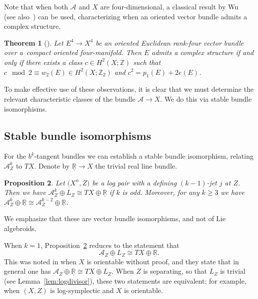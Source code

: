 \documentclass[10pt,a4paper]{amsart}
\numberwithin{equation}{section}
\newtheorem{Theorem}{Theorem}[section]
\newtheorem{Proposition}[Theorem]{Proposition}
 { \theoremstyle{definition}
\newtheorem{Definition}[Theorem]{Definition}
\newtheorem{Example}[Theorem]{Example}
\newtheorem{Remark}[Theorem]{Remark} }
\begin{document}
Note that when both $\mathcal{A}$ and $X$ are four-dimensional, a classical result by Wu~\cite{Wu52} (see also~\cite{HirzebruchHopf58}) can be used, characterizing when an oriented vector bundle admits a complex structure.

\begin{Theorem}[\cite{Wu52}]\label{thm:wuacs} Let $E^4 \to X^4$ be an oriented Euclidean rank-four vector bundle over a~compact oriented four-manifold. Then $E$ admits a complex structure if and only if there exists a class $c \in H^2(X;\mathbb{Z})$ such that $c \!\!\mod 2 \equiv w_2(E) \in H^2(X;\mathbb{Z}_2)$ and $c^2 = p_1(E) + 2 e(E)$.
\end{Theorem}

To make effective use of these observations, it is clear that we must determine the relevant characteristic classes of the bundle $\mathcal{A} \to X$. We do this via stable bundle isomorphisms.

\subsection{Stable bundle isomorphisms}\label{sec:stablebundleiso}

For the $b^k$-tangent bundles we can establish a stable bundle isomorphism, relating $\mathcal{A}_Z^k$ to $TX$. Denote by ${\underline{\mathbb{R}}} \to X$ the trivial real line bundle.

\begin{Proposition}\label{prop:bkbundleiso} Let $\big(X^n,Z\big)$ be a log pair with a defining $(k-1)$-jet $j$ at $Z$. Then we have $\mathcal{A}_Z^k \oplus L_Z \cong TX \oplus \underline{\mathbb{R}}$ if $k$ is odd. Moreover, for any $k \geq 3$ we have $\mathcal{A}_Z^k \oplus \underline{\mathbb{R}} \cong \mathcal{A}_Z^{k-2} \oplus \underline{\mathbb{R}}$.
\end{Proposition}

We emphasize that these are vector bundle isomorphisms, and not of Lie algebroids.

\begin{Remark}\label{rem:slightinaccuracy} When $k = 1$, Proposition~\ref{prop:bkbundleiso} reduces to the statement that
\begin{displaymath}
	\mathcal{A}_Z \oplus L_Z \cong TX \oplus \underline{\mathbb{R}}.
\end{displaymath}
This was noted in \cite{CannasDaSilva10, CannasDaSilvaGuilleminWoodward00} when $X$ is orientable without proof, and they state that in general one has $\mathcal{A}_Z \oplus \underline{\mathbb{R}} \cong TX \oplus L_Z$. When $Z$ is separating, so that $L_Z$ is trivial (see Lemma~\ref{lem:logdivisor}), these two statements are equivalent; for example, when $(X,Z)$ is log-symplectic and $X$ is orientable.
\end{Remark}
\end{document}
